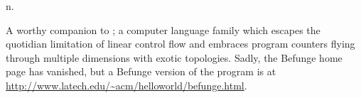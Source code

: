  n.

A worthy companion to ; a computer language family which
escapes the quotidian limitation of linear control flow and embraces program
counters flying through multiple dimensions with exotic topologies. Sadly, the
Befunge home page has vanished, but a Befunge version of the  program is at \url{http://www.latech.edu/~acm/helloworld/befunge.html}.

